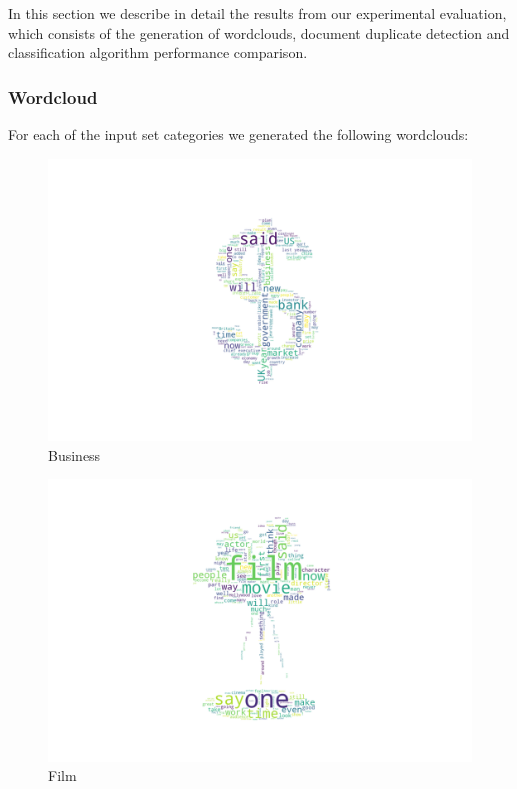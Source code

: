 In this section we describe in detail the results from our experimental evaluation, which consists of the generation of wordclouds, document duplicate detection and classification algorithm performance comparison.

\subsubsection{Wordcloud}
For each of the input set categories we generated the following wordclouds:

\begin{figure}[H]
\centering
\includegraphics[scale=0.35]{images/Wordcloud_Business.png}
\caption{Business}
\end{figure}

\begin{figure}[H]
\centering
\includegraphics[scale=0.35]{images/Wordcloud_Film.png}
\caption{Film}
\end{figure}

